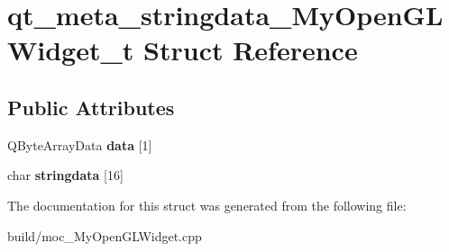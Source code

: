 \hypertarget{structqt__meta__stringdata___my_open_g_l_widget__t}{\section{qt\+\_\+meta\+\_\+stringdata\+\_\+\+My\+Open\+G\+L\+Widget\+\_\+t Struct Reference}
\label{structqt__meta__stringdata___my_open_g_l_widget__t}
}
\subsection*{Public Attributes}
\begin{DoxyCompactItemize}
\item 
\hypertarget{structqt__meta__stringdata___my_open_g_l_widget__t_a6d053366e078c3f311652e272706e905}{Q\+Byte\+Array\+Data {\bfseries data} \mbox{[}1\mbox{]}}\label{structqt__meta__stringdata___my_open_g_l_widget__t_a6d053366e078c3f311652e272706e905}

\item 
\hypertarget{structqt__meta__stringdata___my_open_g_l_widget__t_a3dd2c402b5db37af25c4a49efa158bca}{char {\bfseries stringdata} \mbox{[}16\mbox{]}}\label{structqt__meta__stringdata___my_open_g_l_widget__t_a3dd2c402b5db37af25c4a49efa158bca}

\end{DoxyCompactItemize}


The documentation for this struct was generated from the following file\+:\begin{DoxyCompactItemize}
\item 
build/moc\+\_\+\+My\+Open\+G\+L\+Widget.\+cpp\end{DoxyCompactItemize}
